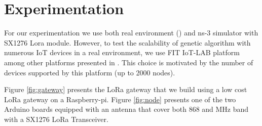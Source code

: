 \section{Experimentation} \label{sec:Experimentation}

For our experimentation we use both real environment () and ns-3 simulator with SX1276 Lora module.
However,
	to test the scalability of genetic algorithm with numerous IoT devices in a real environment,
	we use FIT IoT-LAB platform among other platforms presented in \cite{tonneau_how_2015}.
This choice is motivated by the number of devices supported by this platform (up to 2000 nodes).

Figure \ref{fig:gateway} presents the LoRa gateway that we build using a low cost LoRa gateway \cite{lowcostloragateway} on a Raspberry-pi.
Figure \ref{fig:node} presents one of the two Arduino boards equipped with an antenna that cover both 868 and  MHz band with a SX1276 LoRa Transceiver.


